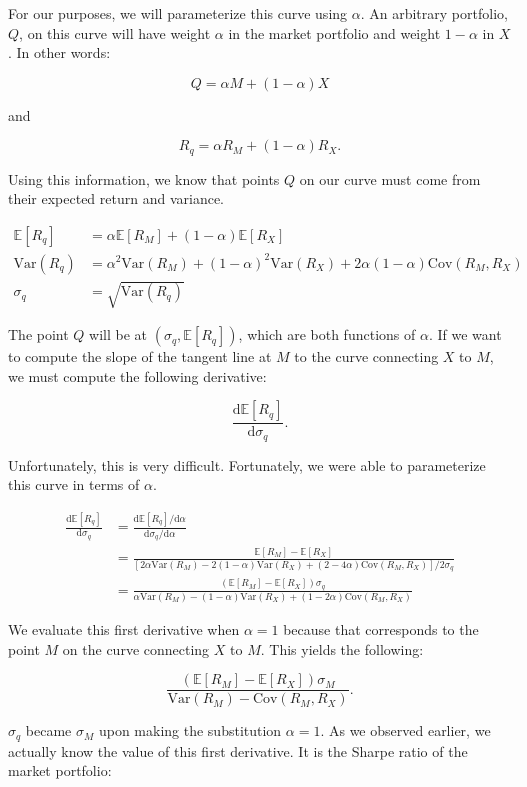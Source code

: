 \documentclass{ximera}
\begin{document}
For our purposes, we will parameterize this curve using $\alpha$. An arbitrary portfolio, $Q$, on this curve will have weight $\alpha$ in the market portfolio and weight $1-\alpha$ in $X$. In other words:

\[
Q=\alpha M+(1-\alpha)X
\]

and

\[
R_q=\alpha R_M+(1-\alpha)R_X.
\]

Using this information, we know that points $Q$ on our curve must come from their expected return and variance.

\begin{align*}
\mathbb{E}[R_q] 		&=\alpha\mathbb{E}[R_M]+(1-\alpha)\mathbb{E}[R_X]\\
\text{Var}(R_q) 		&=\alpha^2\text{Var}(R_M)+(1-\alpha)^2\text{Var}(R_X)+2\alpha(1-\alpha)\text{Cov}(R_M, R_X)\\
\sigma_q 			&=\sqrt{\text{Var}(R_q)}
\end{align*}

The point $Q$ will be at $(\sigma_q, \mathbb{E}[R_q])$, which are both functions of $\alpha$. If we want to compute the slope of the tangent line at $M$ to the curve connecting $X$ to $M$, we must compute the following derivative:

\[
\frac{\mathrm{d}\mathbb{E}[R_q]}{\mathrm{d}\sigma_q}.
\]

Unfortunately, this is very difficult. Fortunately, we were able to parameterize this curve in terms of $\alpha$.

\begin{align*}
\frac{\mathrm{d}\mathbb{E}[R_q]}{\mathrm{d}\sigma_q} 	&=\frac{\mathrm{d}\mathbb{E}[R_q]/\mathrm{d}\alpha}{\mathrm{d}\sigma_q/\mathrm{d}\alpha}\\
									&=\frac{\mathbb{E}[R_M]-\mathbb{E}[R_X]}{[2\alpha\text{Var}(R_M)-2(1-\alpha)\text{Var}(R_X)+(2-4\alpha)\text{Cov}(R_M, R_X)]/2\sigma_q}\\
									&=\frac{(\mathbb{E}[R_M]-\mathbb{E}[R_X])\sigma_q}{\alpha\text{Var}(R_M)-(1-\alpha)\text{Var}(R_X)+(1-2\alpha)\text{Cov}(R_M, R_X)}
\end{align*}
 
We evaluate this first derivative when $\alpha=1$ because that corresponds to the point $M$ on the curve connecting $X$ to $M$. This yields the following:

\[
\frac{(\mathbb{E}[R_M]-\mathbb{E}[R_X])\sigma_M}{\text{Var}(R_M)-\text{Cov}(R_M, R_X)}.
\]

$\sigma_q$ became $\sigma_M$ upon making the substitution $\alpha=1$. As we observed earlier, we actually know the value of this first derivative. It is the Sharpe ratio of the market portfolio:
\end{document}

